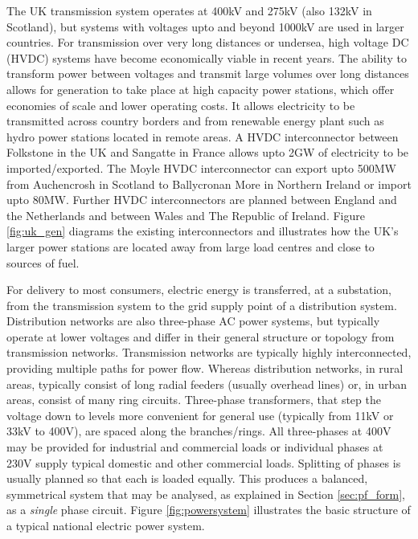 The UK transmission system operates at 400kV and 275kV (also 132kV in
Scotland), but systems with voltages upto and beyond 1000kV are used in
larger countries.  For transmission over very long distances or
undersea, high voltage DC (HVDC) systems have become economically viable in
recent years.  The ability to
transform power between voltages and transmit large volumes over long
distances allows for generation to take place at high capacity power stations,
which offer economies of scale and lower operating costs. It allows electricity to
be transmitted across country borders and from renewable energy plant such as
hydro power stations located in remote areas.  A HVDC interconnector between
Folkstone in the UK and Sangatte in France allows upto 2GW of
electricity to be imported/exported.  The Moyle HVDC interconnector can export
upto 500MW from Auchencrosh in Scotland to Ballycronan More in Northern
Ireland or import upto 80MW.  Further HVDC interconnectors are planned between
England and the Netherlands and between Wales and The Republic of Ireland.
Figure \ref{fig:uk_gen} diagrams the existing interconnectors and illustrates
how the UK's larger power stations are located away from large load centres and
close to sources of fuel.

%

For delivery to most consumers, electric energy is transferred, at a
substation, from the transmission system to the grid supply point of a distribution
system.  Distribution networks are also three-phase AC power systems, but
typically operate at lower voltages and differ in their general
structure or topology from transmission networks.  Transmission networks are
typically highly interconnected, providing multiple paths for power flow.
Whereas distribution networks, in rural areas, typically consist of long radial
feeders (usually overhead lines) or, in urban areas, consist of many ring
circuits.  Three-phase transformers, that step the voltage down to levels
more convenient for general use (typically from 11kV or 33kV to 400V), are
spaced along the branches/rings. All three-phases at 400V may be provided for
industrial and commercial loads or individual phases at 230V supply typical
domestic and other commercial loads. Splitting of phases is usually planned so
that each is loaded equally. This produces a balanced, symmetrical system that
may be analysed, as explained in Section \ref{sec:pf_form}, as a
\textit{single} phase circuit.  Figure \ref{fig:powersystem} illustrates the
basic structure of a typical national electric power system.


